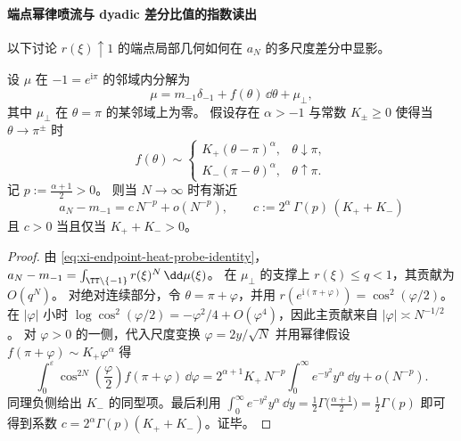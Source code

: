 

\paragraph{端点幂律喷流与 dyadic 差分比值的指数读出}
以下讨论 \(r(\xi)\uparrow 1\) 的端点局部几何如何在 \(a_N\) 的多尺度差分中显影。

\begin{theorem}[端点幂律密度诱导的探针主项]\label{thm:xi-endpoint-heat-probe-powerlaw-leading}
设 \(\mu\) 在 \(-1=e^{\mathrm{i}\pi}\) 的邻域内分解为
\[
\mu=m_{-1}\delta_{-1}+f(\theta)\,\dd\theta+\mu_\perp,
\]
其中 \(\mu_\perp\) 在 \(\theta=\pi\) 的某邻域上为零。
假设存在 \(\alpha>-1\) 与常数 \(K_\pm\ge 0\) 使得当 \(\theta\to\pi^\pm\) 时
\[
f(\theta)\sim
\begin{cases}
K_+(\theta-\pi)^\alpha,& \theta\downarrow\pi,\\
K_-(\pi-\theta)^\alpha,& \theta\uparrow\pi.
\end{cases}
\]
记 \(p:=\frac{\alpha+1}{2}>0\)。
则当 \(N\to\infty\) 时有渐近
\begin{equation}\label{eq:xi-endpoint-heat-probe-powerlaw-asymptotic}
\boxed{\;
a_N-m_{-1}
=c\,N^{-p}+o(N^{-p}),\qquad
c:=2^\alpha\,\Gamma(p)\,(K_++K_-)\;}
\end{equation}
且 \(c>0\) 当且仅当 \(K_++K_->0\)。
\end{theorem}
\begin{proof}
由 \eqref{eq:xi-endpoint-heat-probe-identity}，
\(
a_N-m_{-1}=\int_{\TT\setminus\{-1\}}r(\xi)^N\,\dd\mu(\xi)
\)。
在 \(\mu_\perp\) 的支撑上 \(r(\xi)\le q<1\)，其贡献为 \(O(q^N)\)。
对绝对连续部分，令 \(\theta=\pi+\varphi\)，并用
\(
r(e^{\mathrm{i}(\pi+\varphi)})=\cos^2(\varphi/2)
\)。
在 \(|\varphi|\) 小时
\(
\log\cos^2(\varphi/2)=-\varphi^2/4+O(\varphi^4)
\)，因此主贡献来自 \(|\varphi|\asymp N^{-1/2}\)。
对 \(\varphi>0\) 的一侧，代入尺度变换 \(\varphi=2y/\sqrt N\) 并用幂律假设
\(
f(\pi+\varphi)\sim K_+\varphi^\alpha
\) 得
\[
\int_{0}^{\varepsilon}\cos^{2N}\!\left(\frac{\varphi}{2}\right)f(\pi+\varphi)\,\dd\varphi
=2^{\alpha+1}K_+\,N^{-p}\int_{0}^{\infty}e^{-y^2}y^\alpha\,\dd y+o(N^{-p}).
\]
同理负侧给出 \(K_-\) 的同型项。最后利用
\(
\int_0^\infty e^{-y^2}y^\alpha\,\dd y=\frac12\Gamma\!\bigl(\frac{\alpha+1}{2}\bigr)=\frac12\Gamma(p)
\)
即可得到系数 \(c=2^\alpha\Gamma(p)(K_++K_-)\)。证毕。
\end{proof}

